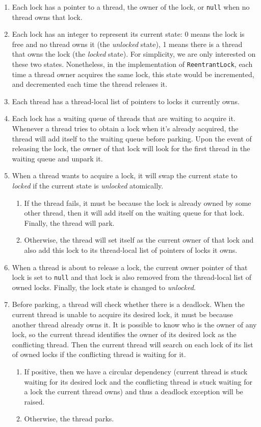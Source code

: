 \begin{enumerate}
\item Each lock has a pointer to a thread, the owner of the lock, or {\tt null} when no thread owns that lock.
\item Each lock has an integer to represent its current state: 0 means the lock is free and no thread owns it (the \emph{unlocked} state), 1 means there is a thread that owns the lock (the \emph{locked} state). For simplicity, we are only interested on these two states. Nonetheless, in the implementation of {\tt ReentrantLock}, each time a thread owner acquires the same lock, this state would be incremented, and decremented each time the thread releases it.
\item Each thread has a thread-local list of pointers to locks it currently owns.
\item Each lock has a waiting queue of threads that are waiting to acquire it. Whenever a thread tries to obtain a lock when it's already acquired, the thread will add itself to the waiting queue before parking. Upon the event of releasing the lock, the owner of that lock will look for the first thread in the waiting queue and unpark it.
\item When a thread wants to acquire a lock, it will swap the current state to \emph{locked} if the current state is \emph{unlocked} atomically.
\begin{enumerate}
\item If the thread fails, it must be because the lock is already owned by some other thread, then it will add itself on the waiting queue for that lock. Finally, the thread will park.
\item Otherwise, the thread will set itself as the current owner of that lock and also add this lock to its thread-local list of pointers of locks it owns.
\end{enumerate}
\item When a thread is about to release a lock, the current owner pointer of that lock is set to {\tt null} and that lock is also removed from the thread-local list of owned locks. Finally, the lock state is changed to \emph{unlocked}.
\item Before parking, a thread will check whether there is a deadlock. When the current thread is unable to acquire its desired lock, it must be because another thread already owns it. It is possible to know who is the owner of any lock, so the current thread identifies the owner of its desired lock as the conflicting thread. Then the current thread will search on each lock of its list of owned locks if the conflicting thread is waiting for it.
\begin{enumerate}
\item If positive, then we have a circular dependency (current thread is stuck waiting for its desired lock and the conflicting thread is stuck waiting for a lock the current thread owns) and thus a deadlock exception will be raised.
\item Otherwise, the thread parks.
\end{enumerate}
\end{enumerate}

